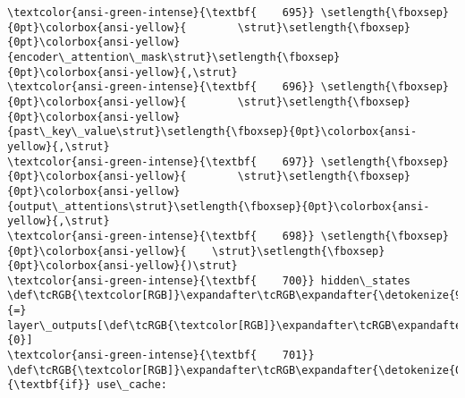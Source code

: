 \documentclass[11pt]{article}
\begin{document}
\begin{Verbatim}[commandchars=\\\{\}, frame=single, framerule=2mm, rulecolor=\color{outerrorbackground}]
\textcolor{ansi-green-intense}{\textbf{    695}} \setlength{\fboxsep}{0pt}\colorbox{ansi-yellow}{        \strut}\setlength{\fboxsep}{0pt}\colorbox{ansi-yellow}{encoder\_attention\_mask\strut}\setlength{\fboxsep}{0pt}\colorbox{ansi-yellow}{,\strut}
\textcolor{ansi-green-intense}{\textbf{    696}} \setlength{\fboxsep}{0pt}\colorbox{ansi-yellow}{        \strut}\setlength{\fboxsep}{0pt}\colorbox{ansi-yellow}{past\_key\_value\strut}\setlength{\fboxsep}{0pt}\colorbox{ansi-yellow}{,\strut}
\textcolor{ansi-green-intense}{\textbf{    697}} \setlength{\fboxsep}{0pt}\colorbox{ansi-yellow}{        \strut}\setlength{\fboxsep}{0pt}\colorbox{ansi-yellow}{output\_attentions\strut}\setlength{\fboxsep}{0pt}\colorbox{ansi-yellow}{,\strut}
\textcolor{ansi-green-intense}{\textbf{    698}} \setlength{\fboxsep}{0pt}\colorbox{ansi-yellow}{    \strut}\setlength{\fboxsep}{0pt}\colorbox{ansi-yellow}{)\strut}
\textcolor{ansi-green-intense}{\textbf{    700}} hidden\_states \def\tcRGB{\textcolor[RGB]}\expandafter\tcRGB\expandafter{\detokenize{98,98,98}}{=} layer\_outputs[\def\tcRGB{\textcolor[RGB]}\expandafter\tcRGB\expandafter{\detokenize{98,98,98}}{0}]
\textcolor{ansi-green-intense}{\textbf{    701}} \def\tcRGB{\textcolor[RGB]}\expandafter\tcRGB\expandafter{\detokenize{0,135,0}}{\textbf{if}} use\_cache:


\end{Verbatim}
\end{document}
